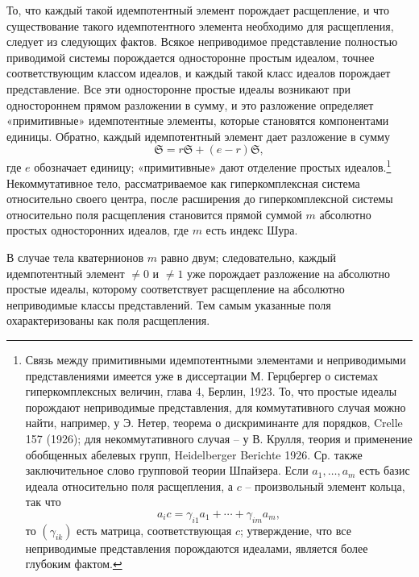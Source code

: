 \documentclass[11pt]{article}
\newcommand{\mS}{\mathfrak{S}}
\begin{document}
\noindent То, что каждый такой идемпотентный элемент порождает расщепление, и что существование такого идемпотентного элемента необходимо для расщепления, следует из следующих фактов. Всякое неприводимое представление полностью приводимой системы порождается односторонне простым идеалом, точнее соответствующим классом идеалов, и каждый такой класс идеалов порождает представление. Все эти односторонне простые идеалы возникают при одностороннем прямом разложении в сумму, и это разложение определяет «примитивные» идемпотентные элементы, которые становятся компонентами единицы. Обратно, каждый идемпотентный элемент дает разложение в сумму
\[
        \mS=r\mS+(e-r)\mS,
\]
где $e$ обозначает единицу; «примитивные» дают отделение простых идеалов.\footnote{Связь между примитивными идемпотентными элементами и неприводимыми представлениями имеется уже в диссертации М. Герцбергер о системах гиперкомплексных величин, глава 4, Берлин, 1923. То, что простые идеалы порождают неприводимые представления, для коммутативного случая можно найти, например, у Э. Нетер, теорема о дискриминанте для порядков, Crelle 157 (1926); для некоммутативного случая -- у В. Крулля, теория и применение обобщенных абелевых групп, Heidelberger Berichte 1926. Ср. также заключительное слово групповой теории Шпайзера. Если $a_1,\ldots,a_m$ есть базис идеала относительно поля расщепления, а $c$ -- произвольный элемент кольца, так что
\[
        a_i c=\gamma_{i1}a_1+\cdots+\gamma_{im}a_m,
\]
то $(\gamma_{ik})$ есть матрица, соответствующая $c$; утверждение, что все неприводимые представления порождаются идеалами, является более глубоким фактом.} Некоммутативное тело, рассматриваемое как гиперкомплексная система относительно своего центра, после расширения до гиперкомплексной системы относительно поля расщепления становится прямой суммой $m$ абсолютно простых односторонних идеалов, где $m$ есть индекс Шура.

\medskip

\noindent В случае тела кватернионов $m$ равно двум; следовательно, каждый идемпотентный элемент $\ne0$ и $\ne1$ уже порождает разложение на абсолютно простые идеалы, которому соответствует расщепление на абсолютно неприводимые классы представлений. Тем самым указанные поля охарактеризованы как поля расщепления.
\end{document}
